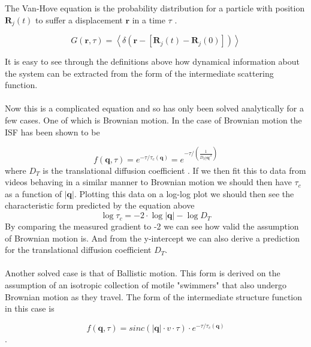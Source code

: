 \documentclass[11pt]{article}
\begin{document}
The Van-Hove equation is the probability distribution for a particle with position $\textbf{R}_j(t)$ to suffer a displacement $\textbf{r}$ in a time $\tau$ \cite{DLSPecora}.

\begin{equation}
	G(\textbf{r}, \tau) = \left\langle \delta (\textbf{r} - [\textbf{R}_j(t) - \textbf{R}_j(0)]) \right\rangle
\end{equation}

It is easy to see through the definitions above how dynamical information about the system can be extracted from the form of the intermediate scattering function.
\\\\
Now this is a complicated equation and so has only been solved analytically for a few cases. One of which is Brownian motion. In the case of Brownian motion the ISF has been shown to be

\begin{equation}
\label{eqn:BrownianISF}
	f(\textbf{q}, \tau) = e^{- \tau / \tau_c(\textbf{q})} = e^{- \tau / (\frac{1}{D_T |\textbf{q}|^2})}
\end{equation}
where $D_T$ is the translational diffusion coefficient \cite{ddm1}. If we then fit this to data from videos behaving in a similar manner to Brownian motion we should then have $\tau_c$ as a function of $|\textbf{q}|$. Plotting this data on a log-log plot we should then see the characteristic form predicted by the equation above
\begin{equation}
\log{\tau_c} = -2 \cdot \log{|\textbf{q}|} - \log{D_T}
\end{equation}
By comparing the measured gradient to -2 we can see how valid the assumption of Brownian motion is. And from the y-intercept we can also derive a prediction for the translational diffusion coefficient $D_T$.
\\\\
Another solved case is that of Ballistic motion. This form is derived on the assumption of an isotropic collection of motile "swimmers" that also undergo Brownian motion as they travel. The form of the intermediate structure function in this case is 

\begin{equation}
\label{eqn:BallisticISF}
	f(\textbf{q}, \tau) = sinc(|\textbf{q}| \cdot v \cdot \tau) \cdot e^{- \tau / \tau_c(\textbf{q})}
\end{equation} \cite{DLSPecora}.
\end{document}
